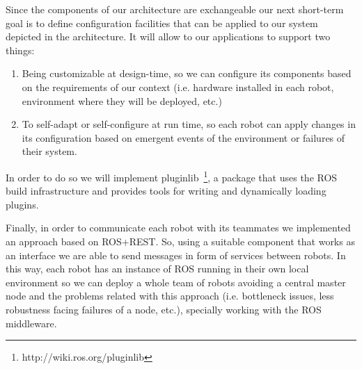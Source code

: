 Since the components of our architecture are exchangeable our next short-term goal is to define configuration facilities that can be applied to our system depicted in the architecture.
It will allow to our applications to support two things:
\begin{enumerate}
\item Being customizable at design-time, so we can configure its components based on the requirements of our context (i.e. hardware installed in each robot, environment where they will be deployed, etc.)
\item To self-adapt or self-configure at run time, so each robot can apply changes in its configuration based on emergent events of the environment or failures of their system.
\end{enumerate}

In order to do so we will implement pluginlib~\footnote{http://wiki.ros.org/pluginlib}, a package that uses the ROS build infrastructure and provides tools for writing and dynamically loading plugins.

Finally, in order to communicate each robot with its teammates we implemented an approach based on ROS+REST.
So, using a suitable component that works as an interface we are able to send messages in form of services between robots.
In this way, each robot has an instance of ROS running in their own local environment so we can deploy a whole team of robots avoiding a central master node and the problems related with this approach (i.e. bottleneck issues, less robustness facing failures of a node, etc.), specially working with the ROS middleware.

